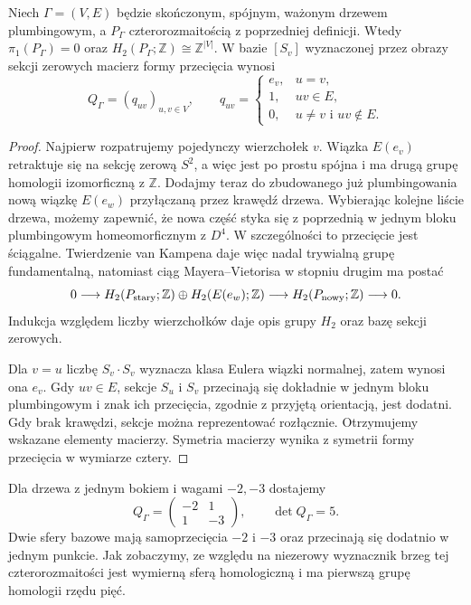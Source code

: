 \begin{twierdzenie}
\label{thm:tg-plumbing-intersection}
Niech $\Gamma=(V,E)$ będzie skończonym, spójnym, ważonym
drzewem plumbingowym, a $P_\Gamma$ czterorozmaitością
z poprzedniej definicji. Wtedy $\pi_1(P_\Gamma)=0$ oraz
$H_2(P_\Gamma;\mathbb Z)\cong\mathbb Z^{|V|}$.
W bazie $[S_v]$ wyznaczonej przez obrazy sekcji zerowych
macierz formy przecięcia wynosi
\[
Q_\Gamma=(q_{uv})_{u,v\in V},\qquad
q_{uv}=\begin{cases}
e_v,&u=v,\\
1,&uv\in E,\\
0,&u\ne v\text{ i }uv\notin E.
\end{cases}
\]
\end{twierdzenie}

\begin{proof}
Najpierw rozpatrujemy pojedynczy wierzchołek $v$.
Wiązka $E(e_v)$ retraktuje się na sekcję zerową $S^2$,
a więc jest po prostu spójna i ma drugą grupę homologii
izomorficzną z $\mathbb Z$. Dodajmy teraz do zbudowanego
już plumbingowania nową wiązkę $E(e_w)$ przyłączaną
przez krawędź drzewa. Wybierając kolejne liście drzewa,
możemy zapewnić, że nowa część styka się z poprzednią
w jednym bloku plumbingowym homeomorficznym z $D^4$.
W szczególności to przecięcie jest ściągalne.
Twierdzenie van Kampena daje więc nadal trywialną grupę
fundamentalną, natomiast ciąg Mayera--Vietorisa w stopniu
drugim ma postać
\[
0\longrightarrow H_2(P_{\rm stary};\mathbb Z)\oplus
H_2(E(e_w);\mathbb Z)\longrightarrow
H_2(P_{\rm nowy};\mathbb Z)\longrightarrow0.
\]
Indukcja względem liczby wierzchołków daje opis grupy
$H_2$ oraz bazę sekcji zerowych.

Dla $v=u$ liczbę $S_v\cdot S_v$ wyznacza klasa Eulera
wiązki normalnej, zatem wynosi ona $e_v$. Gdy $uv\in E$,
sekcje $S_u$ i $S_v$ przecinają się dokładnie w jednym
bloku plumbingowym i znak ich przecięcia, zgodnie z
przyjętą orientacją, jest dodatni. Gdy brak krawędzi,
sekcje można reprezentować rozłącznie. Otrzymujemy
wskazane elementy macierzy. Symetria macierzy wynika
z symetrii formy przecięcia w wymiarze cztery.
\end{proof}

\begin{przyklad}
Dla drzewa z jednym bokiem i wagami $-2,-3$ dostajemy
\[
Q_\Gamma=\begin{pmatrix}-2&1\\1&-3\end{pmatrix},
\qquad \det Q_\Gamma=5.
\]
Dwie sfery bazowe mają samoprzecięcia $-2$ i $-3$ oraz
przecinają się dodatnio w jednym punkcie. Jak zobaczymy,
ze względu na niezerowy wyznacznik brzeg tej czterorozmaitości
jest wymierną sferą homologiczną i ma pierwszą grupę homologii
rzędu pięć.
\end{przyklad}

